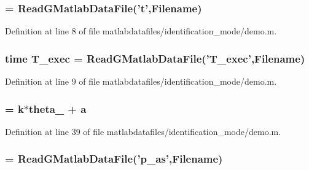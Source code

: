 \subsubsection[{t}]{ = ReadGMatlabDataFile('{\bf t}',{\bf Filename})}\label{matlabdatafiles_2identification__mode_2demo_8m_aaccc9105df5383111407fd5b41255e23}


Definition at line 8 of file matlabdatafiles/identification\_\-mode/demo.m.
\subsubsection[{T\_\-exec}]{\setlength{\rightskip}{0pt plus 5cm}time {\bf T\_\-exec} = ReadGMatlabDataFile('{\bf T\_\-exec}',{\bf Filename})}\label{matlabdatafiles_2identification__mode_2demo_8m_adb469792c94cc4a97fd02941349766b9}


Definition at line 9 of file matlabdatafiles/identification\_\-mode/demo.m.
\subsubsection[{theta\_\-1}]{ = {\bf k}$\ast${\bf theta\_} + {\bf a}}\label{matlabdatafiles_2identification__mode_2demo_8m_ac951b784fc028491b02f210408071f00}


Definition at line 39 of file matlabdatafiles/identification\_\-mode/demo.m.
\subsubsection[{theta\_\-2}]{ = ReadGMatlabDataFile('p\_\-as',{\bf Filename})}\label{matlabdatafiles_2identification__mode_2demo_8m_acf332723297849f64a9169282c1237c5}


